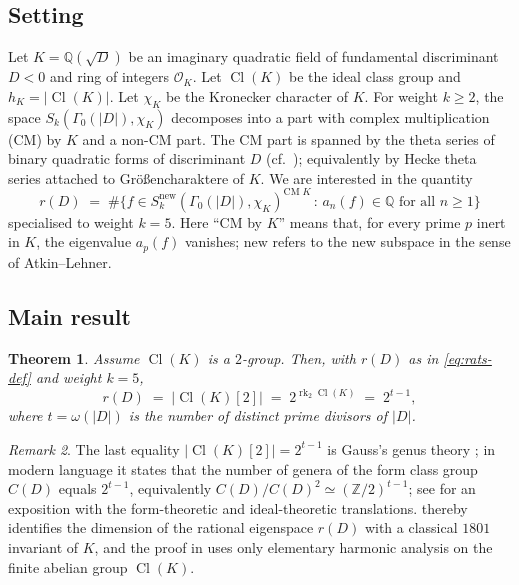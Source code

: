 \documentclass[11pt]{amsart}
\newtheorem{theorem}{Theorem}
\theoremstyle{definition}
\theoremstyle{remark}
\newtheorem{remark}[theorem]{Remark}
\DeclareMathOperator{\Cl}{Cl}
\DeclareMathOperator{\rk}{rk}
\newcommand{\Q}{\mathbb{Q}}
\newcommand{\Z}{\mathbb{Z}}
\newcommand{\OK}{\mathcal{O}_K}
\newcommand{\chiK}{\chi_K}
\begin{document}
\subsection{Setting}
Let \(K = \Q(\sqrt{D})\) be an imaginary quadratic field of fundamental
discriminant \(D < 0\) and ring of integers \(\OK\). Let \(\Cl(K)\) be
the ideal class group and \(h_K = |\Cl(K)|\). Let \(\chiK\) be the
Kronecker character of \(K\). For weight \(k \ge 2\), the space
\(S_k(\Gamma_0(|D|), \chiK)\) decomposes into a part with complex
multiplication (CM) by \(K\) and a non-CM part. The CM part is
spanned by the theta series of binary quadratic forms of discriminant
\(D\) (cf.\ \cite{Shimura1971}); equivalently by Hecke theta series
attached to Gr\"o\ss encharaktere of \(K\). We are interested in the
quantity
\begin{equation}\label{eq:rats-def}
  r(D) \;=\; \#\bigl\{
     f \in S_k^{\mathrm{new}}(\Gamma_0(|D|), \chiK)^{\mathrm{CM}\;K}
   \,:\, a_n(f) \in \Q \text{ for all } n \ge 1
   \bigr\}
\end{equation}
specialised to weight \(k = 5\). Here ``CM by \(K\)'' means that, for
every prime \(p\) inert in \(K\), the eigenvalue \(a_p(f)\) vanishes;
\(\mathrm{new}\) refers to the new subspace in the sense of
Atkin--Lehner.

\subsection{Main result}
\begin{theorem}\label{thm:main}
Assume \(\Cl(K)\) is a \(2\)-group. Then, with \(r(D)\) as in
\eqref{eq:rats-def} and weight \(k=5\),
\[
  r(D) \;=\; |\Cl(K)[2]| \;=\; 2^{\rk_2 \Cl(K)} \;=\; 2^{t-1},
\]
where \(t = \omega(|D|)\) is the number of distinct prime divisors of
\(|D|\).
\end{theorem}

\begin{remark}\label{rem:gauss-bridge}
The last equality \(|\Cl(K)[2]| = 2^{t-1}\) is Gauss's genus theory
\cite[\S\S 225--237]{Gauss1801}; in modern language it states that the
number of genera of the form class group \(C(D)\) equals \(2^{t-1}\),
equivalently \(C(D)/C(D)^2 \simeq (\Z/2)^{t-1}\); see
\cite[Theorem~3.15]{Cox1989} for an exposition with the form-theoretic
and ideal-theoretic translations.  thereby identifies
the dimension of the rational eigenspace \(r(D)\) with a classical
\(1801\) invariant of \(K\), and the proof in  uses
only elementary harmonic analysis on the finite abelian group
\(\Cl(K)\).
\end{remark}
\end{document}
